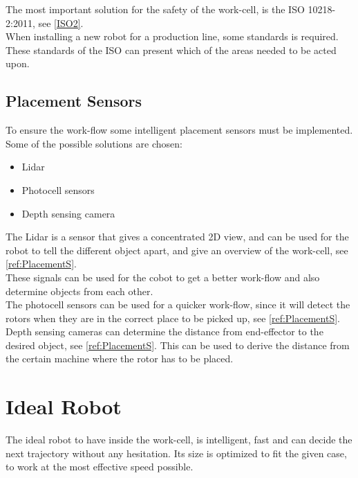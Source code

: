 The most important solution for the safety of the work-cell, is the ISO 10218-2:2011, see \ref{ISO2}.\\
When installing a new robot for a production line, some standards is required. These standards of the ISO can present which of the areas needed to be acted upon.\\

\section{Placement Sensors}

To ensure the work-flow some intelligent placement sensors must be implemented. Some of the possible solutions are chosen:\\

\begin{itemize}
    \item Lidar
    \item Photocell sensors
    \item Depth sensing camera
\end{itemize}

The Lidar is a sensor that gives a concentrated 2D view, and can be used for the robot to tell the different object apart, and give an overview of the work-cell, see \ref{ref:PlacementS}.\\
These signals can be used for the cobot to get a better work-flow and also determine objects from each other.\\

The photocell sensors can be used for a quicker work-flow, since it will detect the rotors when they are in the correct place to be picked up, see \ref{ref:PlacementS}.\\

Depth sensing cameras can determine the distance from end-effector to the desired object, see \ref{ref:PlacementS}. This can be used to derive the distance from the certain machine where the rotor has to be placed.\\

\chapter{Ideal Robot}\label{IdealRobot}

The ideal robot to have inside the work-cell, is intelligent, fast and can decide the next trajectory without any hesitation. Its size is optimized to fit the given case, to work at the most effective speed possible. 


